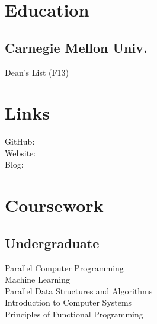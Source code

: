 \documentclass[]{deedy-resume-openfont}
\begin{document}
%
%

%
%



%
%

\begin{minipage}[t]{0.33\textwidth}


\section{Education}

\subsection{Carnegie Mellon Univ.}
Dean's List (F13) \\
\sectionsep


\section{Links}
GitHub: \href{https://github.com/jez}{} \\
Website:  \href{https://jez.io}{} \\
Blog:  \href{http://blog.jez.io}{} \\
\sectionsep


\section{Coursework}
\subsection{Undergraduate}
Parallel Computer Programming\\
Machine Learning\\
Parallel Data Structures and Algorithms\\
Introduction to Computer Systems\\
Principles of Functional Programming\\
\sectionsep


\end{minipage}
\end{document}
